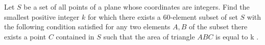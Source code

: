 Let $ S$ be a set of all points of a plane whose coordinates are integers. Find the smallest positive integer $ k$ for which there exists a 60-element subset of set $ S$ with the following condition satisfied for any two elements  $ A,B$ of the subset there exists a point $ C$ contained in  $ S$ such that the area of triangle $ ABC$ is equal to k .